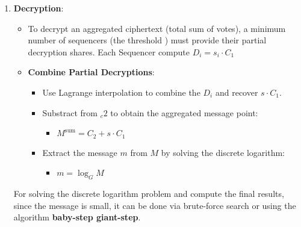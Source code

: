 \begin{enumerate}
	\item \textbf{Decryption}:
	
			\begin{itemize}
				\item To decrypt an aggregated ciphertext (total sum of votes), a minimum number of sequencers (the threshold ) must provide their partial decryption shares. Each Sequencer compute $D_i = s_i \cdot C_1$
				\item \textbf{Combine Partial Decryptions}:
					\begin{itemize}
						\item Use Lagrange interpolation to combine the $D_i$ and recover $s\cdot C_1$.
						\item Substract from $_c2$ to obtain the aggregated message point:
							\begin{itemize}
								\item $M^{\text{sum}} = C_2 + s \cdot C_1$
							\end{itemize}
						\item Extract the message $m$ from $M$ by solving the discrete logarithm:
							\begin{itemize}
								\item $m = \log_G M$
							\end{itemize}
					\end{itemize}
			\end{itemize}
		
	For solving the discrete logarithm problem and compute the final results, since the message is small, it can be done via brute-force search or using the algorithm \textbf{baby-step giant-step}.

\end{enumerate}